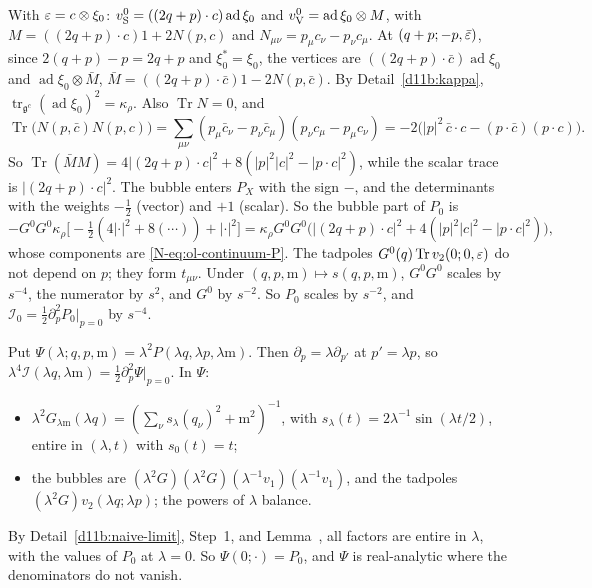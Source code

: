 \begin{step}
With $\varepsilon=c\otimes\xi_0$: $v^0_{\rm S}=((2q+p)\cdot c)\operatorname{ad}\xi_0$ and $v^0_{\rm V}=\operatorname{ad}\xi_0\otimes M$, with $M=((2q+p)\cdot c)1+2N(p,c)$ and $N_{\mu\nu}=p_\mu c_\nu-p_\nu c_\mu$. At $(q+p;-p,\bar{\varepsilon})$, since $2(q+p)-p=2q+p$ and $\xi_0^*=\xi_0$, the vertices are $((2q+p)\cdot\bar c)\operatorname{ad}\xi_0$ and $\operatorname{ad}\xi_0\otimes\bar M$, $\bar M=((2q+p)\cdot\bar c)1-2N(p,\bar c)$. By Detail~\ref{d11b:kappa}, $\operatorname{tr}_{\mathfrak g^c}(\operatorname{ad}\xi_0)^2=\kappa_\rho$. Also $\operatorname{Tr}N=0$, and
\[
\operatorname{Tr}\big(N(p,\bar c)N(p,c)\big)=\sum_{\mu\nu}(p_\mu\bar c_\nu-p_\nu\bar c_\mu)(p_\nu c_\mu-p_\mu c_\nu)=-2\big(|p|^2\,\bar c\cdot c-(p\cdot\bar c)(p\cdot c)\big).
\]
So $\operatorname{Tr}(\bar MM)=4|(2q+p)\cdot c|^2+8(|p|^2|c|^2-|p\cdot c|^2)$, while the scalar trace is $|(2q+p)\cdot c|^2$. The bubble enters $P_X$ with the sign $-$, and the determinants with the weights $-\frac12$ (vector) and $+1$ (scalar). So the bubble part of $P_0$ is
\[
-G^0G^0\kappa_\rho\big[-\tfrac12(4|\cdot|^2+8(\cdots))+|\cdot|^2\big]=\kappa_\rho G^0G^0\big(|(2q+p)\cdot c|^2+4(|p|^2|c|^2-|p\cdot c|^2)\big),
\]
whose components are \eqref{N-eq:ol-continuum-P}. The tadpoles $G^0(q)\operatorname{Tr}v_2(0;0,\varepsilon)$ do not depend on $p$; they form $t_{\mu\nu}$. Under $(q,p,\mathrm m)\mapsto s(q,p,\mathrm m)$, $G^0G^0$ scales by $s^{-4}$, the numerator by $s^2$, and $G^0$ by $s^{-2}$. So $P_0$ scales by $s^{-2}$, and $\mathcal I_0=\frac12\partial_p^2P_0|_{p=0}$ by $s^{-4}$.
\end{step}

\begin{step}[Scaling]
Put $\Psi(\lambda;q,p,\mathrm m)=\lambda^2P(\lambda q,\lambda p,\lambda\mathrm m)$. Then $\partial_p=\lambda\partial_{p'}$ at $p'=\lambda p$, so $\lambda^4\mathcal I(\lambda q,\lambda\mathrm m)=\frac12\partial_p^2\Psi|_{p=0}$. In $\Psi$:
\begin{itemize}
\item $\lambda^2G_{\lambda\mathrm m}(\lambda q)=(\sum_\nu s_\lambda(q_\nu)^2+\mathrm m^2)^{-1}$, with $s_\lambda(t)=2\lambda^{-1}\sin(\lambda t/2)$, entire in $(\lambda,t)$ with $s_0(t)=t$;
\item the bubbles are $(\lambda^2G)(\lambda^2G)(\lambda^{-1}v_1)(\lambda^{-1}v_1)$, and the tadpoles $(\lambda^2G)v_2(\lambda q;\lambda p)$; the powers of $\lambda$ balance.
\end{itemize}
By Detail~\ref{d11b:naive-limit}, Step~1, and Lemma~, all factors are entire in $\lambda$, with the values of $P_0$ at $\lambda=0$. So $\Psi(0;\cdot)=P_0$, and $\Psi$ is real-analytic where the denominators do not vanish.
\end{step}

